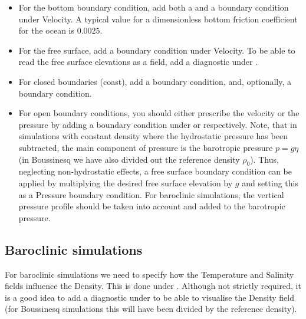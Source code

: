 \begin{itemize}
  \item For the bottom boundary condition, add both a  and a
     boundary condition under Velocity. A
    typical value for a dimensionless bottom friction coefficient for the ocean
    is $0.0025$.
  \item For the free surface, add a  boundary
    condition under Velocity. To be able to read the free surface elevations as
    a field, add a diagnostic  under
    .
  \item For closed boundaries (coast), add a 
    boundary condition, and, optionally, a  boundary
    condition.
  \item For open boundary conditions, you should either prescribe the velocity
    or the pressure by adding a  boundary condition
    under  or 
    respectively. Note, that in simulations with constant density where the
    hydrostatic pressure has been subtracted, the main component of pressure is
    the barotropic pressure $p=g\eta$ (in Boussinesq we have also divided out
    the reference density $\rho_0$). Thus, neglecting non-hydrostatic effects, a
    free surface boundary condition can be applied by multiplying the desired
    free surface elevation by $g$ and setting this as a 
    Pressure boundary condition. For baroclinic simulations, the vertical
    pressure profile should be taken into account and added to the barotropic
    pressure.
\end{itemize}

\subsection{Baroclinic simulations}
For baroclinic simulations we need to specify how the Temperature and Salinity
fields influence the Density. This is done under
. 
Although not strictly required, it is a good idea
to add a diagnostic  under
 to be able to visualise the Density field (for
Boussinesq simulations this will have been divided by the reference density).

